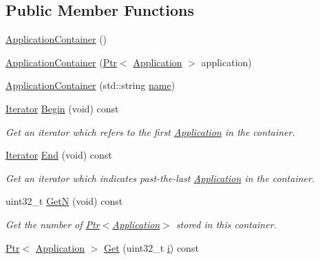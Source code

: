 \subsection*{Public Member Functions}
\begin{DoxyCompactItemize}
\item 
\hyperlink{classns3_1_1ApplicationContainer_a47107db720d99eb889669bd699503015}{Application\+Container} ()
\item 
\hyperlink{classns3_1_1ApplicationContainer_a0a3cabbae527b13d272f23112ecabf71}{Application\+Container} (\hyperlink{classns3_1_1Ptr}{Ptr}$<$ \hyperlink{classns3_1_1Application}{Application} $>$ application)
\item 
\hyperlink{classns3_1_1ApplicationContainer_acaa6df61b4b9efa6d15915be565824f9}{Application\+Container} (std\+::string \hyperlink{generate__test__data__lte__spectrum__model_8m_ab74e6bf80237ddc4109968cedc58c151}{name})
\item 
\hyperlink{classns3_1_1ApplicationContainer_a46d9e435701ffbca57fff95b97cbf0dc}{Iterator} \hyperlink{classns3_1_1ApplicationContainer_ae37428fe2d14afe32cb1a3eecfab2e4e}{Begin} (void) const 
\begin{DoxyCompactList}\small\item\em Get an iterator which refers to the first \hyperlink{classns3_1_1Application}{Application} in the container. \end{DoxyCompactList}\item 
\hyperlink{classns3_1_1ApplicationContainer_a46d9e435701ffbca57fff95b97cbf0dc}{Iterator} \hyperlink{classns3_1_1ApplicationContainer_aed3e63d94451be9779fb8d00d0461bfb}{End} (void) const 
\begin{DoxyCompactList}\small\item\em Get an iterator which indicates past-\/the-\/last \hyperlink{classns3_1_1Application}{Application} in the container. \end{DoxyCompactList}\item 
uint32\+\_\+t \hyperlink{classns3_1_1ApplicationContainer_ad3068a3b77264a6527043beb7f2c05d8}{GetN} (void) const 
\begin{DoxyCompactList}\small\item\em Get the number of \hyperlink{classns3_1_1Ptr}{Ptr$<$\+Application$>$} stored in this container. \end{DoxyCompactList}\item 
\hyperlink{classns3_1_1Ptr}{Ptr}$<$ \hyperlink{classns3_1_1Application}{Application} $>$ \hyperlink{classns3_1_1ApplicationContainer_a9e565807abd4213a56566a7ccd8d7509}{Get} (uint32\+\_\+t \hyperlink{lte__uplink__power__control_8m_a6f6ccfcf58b31cb6412107d9d5281426}{i}) const 

\end{DoxyCompactItemize}
